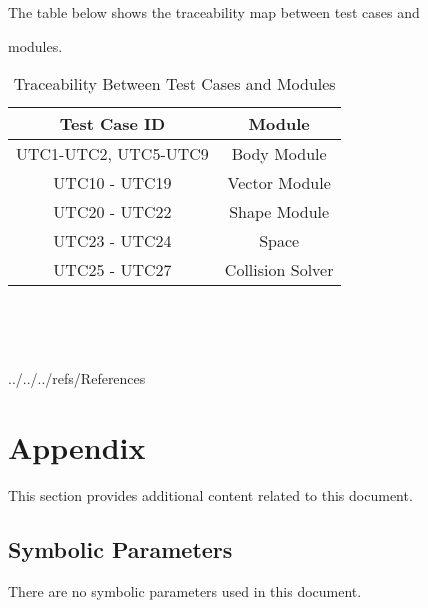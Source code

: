 \documentclass[12pt, titlepage]{article}
\begin{document}
The table below shows the traceability map between test cases and 

modules.

\begin{table} [h!]
	
	\centering
	
	\begin{tabular}{|c|c|}
		
		\hline	
		
		\textbf{Test Case ID} & \textbf{Module}\\
		
		\hline 
		
	
		UTC1-UTC2, UTC5-UTC9& Body Module\\ \hline
		
		UTC10 - UTC19& Vector  Module\\ \hline
		
		UTC20 - UTC22&  Shape Module\\ \hline
		
		UTC23 - UTC24& Space\\ \hline
		
		UTC25 - UTC27& Collision Solver\\ \hline
		
	\end{tabular}
	
	\caption{Traceability Between Test Cases and Modules}
	
	\label{Table:Traceability} 
	
\end{table}
~\newline

~\newpage



 {../../../refs/References}
~\newline
\section{Appendix}
This section provides additional content related to this document.

\subsection{Symbolic Parameters}
There are no symbolic parameters used in this document.
\end{document}
